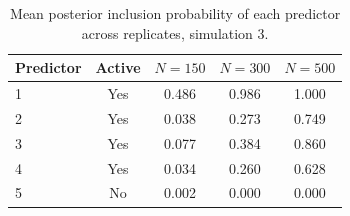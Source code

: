 \begin{table}[H]
\centering
\begin{tabular}{lcccc}
  \toprule
Predictor & Active & $N = 150$ & $N = 300$ & $N = 500$ \\ 
  \midrule
1 & Yes & 0.486 & 0.986 & 1.000 \\ 
  2 & Yes & 0.038 & 0.273 & 0.749 \\ 
  3 & Yes & 0.077 & 0.384 & 0.860 \\ 
  4 & Yes & 0.034 & 0.260 & 0.628 \\ 
  5 & No & 0.002 & 0.000 & 0.000 \\ 
   \bottomrule
\end{tabular}
\caption{Mean posterior inclusion probability of each predictor across replicates, simulation 3.} 
\label{table:sim3_pred_pip}
\end{table}
